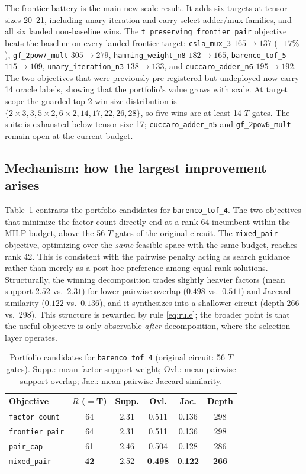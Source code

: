 \documentclass{cbctq}
\begin{document}
The frontier battery is the main new scale result. It adds six targets at tensor sizes 20--21, including unary iteration and carry-select adder/mux families, and all six landed non-baseline wins. The \texttt{t\_preserving\_frontier\_pair} objective beats the baseline on every landed frontier target: \texttt{csla\_mux\_3} $165\to137$ ($-17\%$), \texttt{gf\_2pow7\_mult} $305\to279$, \texttt{hamming\_weight\_n8} $182\to165$, \texttt{barenco\_tof\_5} $115\to109$, \texttt{unary\_iteration\_n3} $138\to133$, and \texttt{cuccaro\_adder\_n6} $195\to192$. The two objectives that were previously pre-registered but undeployed now carry 14 oracle labels, showing that the portfolio's value grows with scale. At target scope the guarded top-2 win-size distribution is $\{2{\times}3,3,5{\times}2,6{\times}2,14,17,22,26,28\}$, so five wins are at least 14 $T$ gates. The suite is exhausted below tensor size 17; \texttt{cuccaro\_adder\_n5} and \texttt{gf\_2pow6\_mult} remain open at the current budget.

\subsection{Mechanism: how the largest improvement arises}

Table~\ref{tab:case} contrasts the portfolio candidates for \texttt{barenco\_tof\_4}. The two objectives that minimize the factor count directly end at a rank-64 incumbent within the MILP budget, above the 56 $T$ gates of the original circuit. The \texttt{mixed\_pair} objective, optimizing over the \emph{same} feasible space with the same budget, reaches rank 42. This is consistent with the pairwise penalty acting as search guidance rather than merely as a post-hoc preference among equal-rank solutions. Structurally, the winning decomposition trades slightly heavier factors (mean support $2.52$ vs.\ $2.31$) for lower pairwise overlap ($0.498$ vs.\ $0.511$) and Jaccard similarity ($0.122$ vs.\ $0.136$), and it synthesizes into a shallower circuit (depth 266 vs.\ 298). This structure is rewarded by rule \eqref{eq:rule}; the broader point is that the useful objective is only observable \emph{after} decomposition, where the selection layer operates.

\begin{table}[hbt]
\centering
\caption{\footnotesize Portfolio candidates for \texttt{barenco\_tof\_4} (original circuit: 56 $T$ gates). Supp.: mean factor support weight; Ovl.: mean pairwise support overlap; Jac.: mean pairwise Jaccard similarity.}
\label{tab:case}
\footnotesize
\begin{tabular}{lccccc}
\toprule
Objective & $R$ ($=$T) & Supp. & Ovl. & Jac. & Depth \\
\midrule
\texttt{factor\_count}   & 64 & 2.31 & 0.511 & 0.136 & 298 \\
\texttt{frontier\_pair}  & 64 & 2.31 & 0.511 & 0.136 & 298 \\
\texttt{pair\_cap}       & 61 & 2.46 & 0.504 & 0.128 & 286 \\
\texttt{mixed\_pair}     & \textbf{42} & 2.52 & \textbf{0.498} & \textbf{0.122} & \textbf{266} \\
\bottomrule
\end{tabular}
\end{table}
\end{document}
